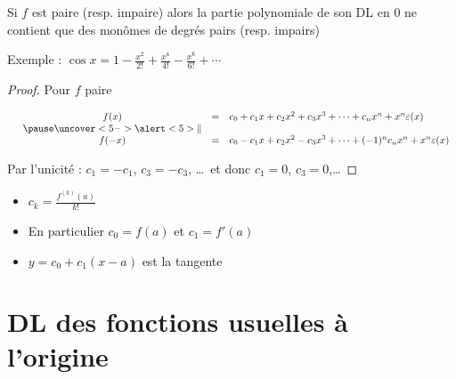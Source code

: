 \begin{frame}

\begin{corollaire}
Si $f$ est paire (resp. impaire) alors la partie polynomiale de son DL en $0$
ne contient que des monômes de degrés pairs (resp. impairs) 
\end{corollaire}

\pause

Exemple : $\cos x=1-\frac{x^2}{2!}+\frac{x^4}{4!}-\frac{x^6}{6!}+\cdots$

\pause

\begin{proof}
Pour $f$ paire
\medskip

$\begin{array}{rccl}
  & f(x)  & = & c_0+c_1 x +c_2x^2+c_3x^3+\cdots+c_nx^n+x^n\epsilon(x)  \\
  & \pause
\uncover<5->{\alert<5>{\mathbf\parallel}} && \\
  & f(-x) & = & c_0-c_1 x+c_2x^2-c_3x^3 +\cdots+(-1)^nc_nx^n+x^n\epsilon(x)
\end{array}$

\pause

\pause
\medskip

Par l'unicité : $c_1=-c_1$, $c_3=-c_3$, \ldots \ 
\pause et donc $c_1=0$, $c_3=0$,\ldots
\end{proof}

\pause

\begin{itemize}
  \item $c_k = \frac{f^{(k)}(a)}{k!}$
\pause
  \item En particulier $c_0=f(a)$ et $c_1=f'(a)$ 
\pause
  \item $y=c_0+c_1(x-a)$ est la tangente 
\end{itemize}
 
\end{frame}

\section{DL des fonctions usuelles à l'origine}

